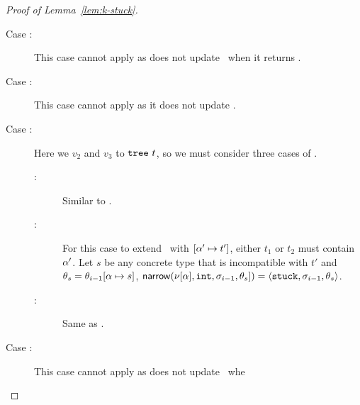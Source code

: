 \begin{proof}[Proof of Lemma~\ref{lem:k-stuck}]
\begin{description}
    \item[Case \reappbad:]
      This case cannot apply as \forcesym does not update \tsu\ when
      it returns \stuck.
    \item[Case \releafgood:]
      This case cannot apply as it does not update \tsu.
    \item[Case \renodegood:]
      Here we \forcesym $v_2$ and $v_3$ to $\mathtt{tree}\ t$,
      so we must consider three cases of \forcesym.
      \begin{description}
      \item[:]
        Similar to \replusgood.
      \item[:]
        For this case to extend \tsu\ with $[\alpha' \mapsto t']$,
        either $t_1$ or $t_2$ must contain $\alpha'$.
        Let $s$ be any concrete type that is incompatible with $t'$
        and $\theta_s = \theta_{i-1}[\alpha \mapsto s]$,
        $\mathsf{narrow}(\nu[\alpha], \mathtt{int}, \sigma_{i-1}, \theta_s]) = \langle \mathtt{stuck}, \sigma_{i-1}, \theta_s \rangle$.
      \item[:]
        Same as .
      \end{description}
    \item[Case \renodebadone:]
      This case cannot apply as \forcesym does not update \tsu\ whe

\end{description}
\end{proof}
